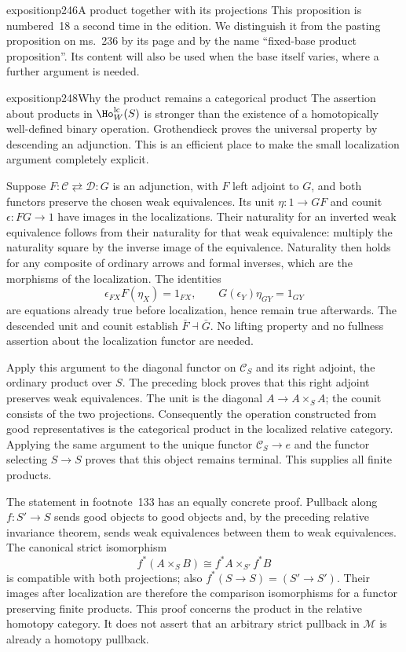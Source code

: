 \begin{dcomment}{exposition}{p246}{A product together with its projections}
This proposition is numbered~18 a second time in the edition. We distinguish it from the pasting proposition on ms.~236 by its page and by the name ``fixed-base product proposition''. Its content will also be used when the base itself varies, where a further argument is needed.
\end{dcomment}

\begin{dcomment}{exposition}{p248}{Why the product remains a categorical product}
The assertion about products in $\Ho_W^{\mathrm{lc}}(S)$ is stronger than the existence of a homotopically well-defined binary operation. Grothendieck proves the universal property by descending an adjunction. This is an efficient place to make the small localization argument completely explicit.

Suppose $F:\mathcal C\rightleftarrows\mathcal D:G$ is an adjunction, with $F$ left adjoint to $G$, and both functors preserve the chosen weak equivalences. Its unit $\eta:1\to GF$ and counit $\epsilon:FG\to1$ have images in the localizations. Their naturality for an inverted weak equivalence follows from their naturality for that weak equivalence: multiply the naturality square by the inverse image of the equivalence. Naturality then holds for any composite of ordinary arrows and formal inverses, which are the morphisms of the localization. The identities
\[
 \epsilon_{F X}F(\eta_X)=1_{F X},\qquad
 G(\epsilon_Y)\eta_{G Y}=1_{G Y}
\]
are equations already true before localization, hence remain true afterwards. The descended unit and counit establish $\bar F\dashv\bar G$. No lifting property and no fullness assertion about the localization functor are needed.

Apply this argument to the diagonal functor on $\mathcal C_S$ and its right adjoint, the ordinary product over $S$. The preceding block proves that this right adjoint preserves weak equivalences. The unit is the diagonal $A\to A\times_S A$; the counit consists of the two projections. Consequently the operation constructed from good representatives is the categorical product in the localized relative category. Applying the same argument to the unique functor $\mathcal C_S\to e$ and the functor selecting $S\to S$ proves that this object remains terminal. This supplies all finite products.

The statement in footnote~133 has an equally concrete proof. Pullback along $f:S'\to S$ sends good objects to good objects and, by the preceding relative invariance theorem, sends weak equivalences between them to weak equivalences. The canonical strict isomorphism
\[
 f^*(A\times_S B)\cong f^*A\times_{S'}f^*B
\]
is compatible with both projections; also $f^*(S\to S)=(S'\to S')$. Their images after localization are therefore the comparison isomorphisms for a functor preserving finite products. This proof concerns the product in the relative homotopy category. It does not assert that an arbitrary strict pullback in $\mathcal M$ is already a homotopy pullback.
\end{dcomment}

